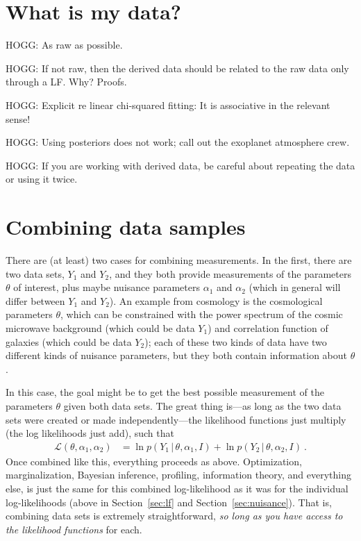 \documentclass{article}
\newcommand{\sectionname}{Section}
\newcommand{\secref}[1]{\sectionname~\ref{#1}}
\newcommand{\given}{\,|\,}
\begin{document}
\section{What is my data?}\label{sec:data}
HOGG: As raw as possible.

HOGG: If not raw, then the derived data should be related to the raw data only through a LF. Why? Proofs.

HOGG: Explicit re linear chi-squared fitting: It is associative in the relevant sense!

HOGG: Using posteriors does not work; call out the exoplanet atmosphere crew.

HOGG: If you are working with derived data, be careful about repeating the data or using it twice.

\section{Combining data samples}\label{sec:combining}
There are (at least) two cases for combining measurements.
In the first, there are two data sets, $Y_1$ and $Y_2$, and they both provide measurements of the parameters $\theta$ of interest, plus maybe nuisance parameters $\alpha_1$ and $\alpha_2$ (which in general will differ between $Y_1$ and $Y_2$).
An example from cosmology is the cosmological parameters $\theta$, which can be constrained with the power spectrum of the cosmic microwave background (which could be data $Y_1$) and correlation function of galaxies (which could be data $Y_2$); each of these two kinds of data have two different kinds of nuisance parameters, but they both contain information about $\theta$.

In this case, the goal might be to get the best possible measurement of the parameters $\theta$ given both data sets.
The great thing is---as long as the two data sets were created or made independently---the likelihood functions just multiply (the log likelihoods just add), such that
\begin{align}
    \mathscr{L}(\theta,\alpha_1,\alpha_2) &= \ln p(Y_1\given\theta,\alpha_1,I) + \ln p(Y_2\given\theta,\alpha_2,I) ~.\label{eq:combineLFs}
\end{align}
Once combined like this, everything proceeds as above.
Optimization, marginalization, Bayesian inference, profiling, information theory, and everything else, is just the same for this combined log-likelihood as it was for the individual log-likelihoods (above in \secref{sec:lf} and \secref{sec:nuisance}).
That is, combining data sets is extremely straightforward, \emph{so long as you have access to the likelihood functions} for each.
\end{document}
